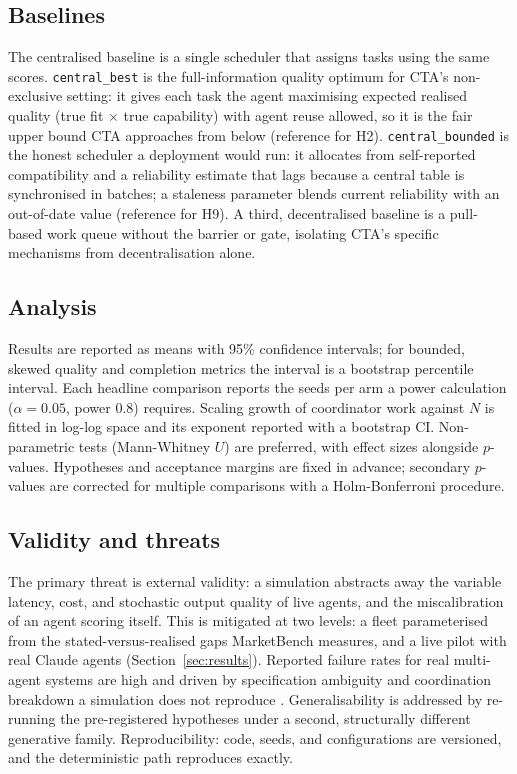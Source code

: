 \documentclass[11pt]{article}
\newcommand{\code}[1]{\texttt{#1}}
\begin{document}
\subsection{Baselines}\label{sec:baseline}
The centralised baseline is a single scheduler that assigns tasks using the same scores. \code{central\_best} is the full-information quality optimum for CTA's non-exclusive setting: it gives each task the agent maximising expected realised quality (true fit $\times$ true capability) with agent reuse allowed, so it is the fair upper bound CTA approaches from below (reference for H2). \code{central\_bounded} is the honest scheduler a deployment would run: it allocates from self-reported compatibility and a reliability estimate that lags because a central table is synchronised in batches; a staleness parameter blends current reliability with an out-of-date value (reference for H9). A third, decentralised baseline is a pull-based work queue without the barrier or gate, isolating CTA's specific mechanisms from decentralisation alone.

\subsection{Analysis}
Results are reported as means with 95\% confidence intervals; for bounded, skewed quality and completion metrics the interval is a bootstrap percentile interval. Each headline comparison reports the seeds per arm a power calculation ($\alpha=0.05$, power $0.8$) requires. Scaling growth of coordinator work against $N$ is fitted in log-log space and its exponent reported with a bootstrap CI. Non-parametric tests (Mann-Whitney $U$) are preferred, with effect sizes alongside $p$-values. Hypotheses and acceptance margins are fixed in advance; secondary $p$-values are corrected for multiple comparisons with a Holm-Bonferroni procedure.

\subsection{Validity and threats}
The primary threat is external validity: a simulation abstracts away the variable latency, cost, and stochastic output quality of live agents, and the miscalibration of an agent scoring itself. This is mitigated at two levels: a fleet parameterised from the stated-versus-realised gaps MarketBench measures, and a live pilot with real Claude agents (Section~\ref{sec:results}). Reported failure rates for real multi-agent systems are high and driven by specification ambiguity and coordination breakdown a simulation does not reproduce \citep{cemri2025multiagent}. Generalisability is addressed by re-running the pre-registered hypotheses under a second, structurally different generative family. Reproducibility: code, seeds, and configurations are versioned, and the deterministic path reproduces exactly.
\end{document}
